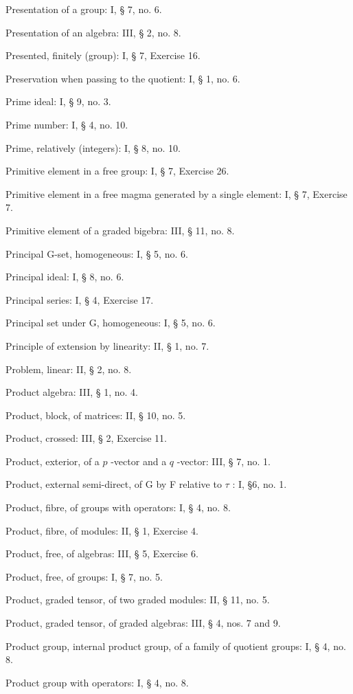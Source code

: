 Presentation of a group: I, § 7, no. 6.

Presentation of an algebra: III, § 2, no. 8.

Presented, finitely (group): I, § 7, Exercise 16.

Preservation when passing to the quotient: I, § 1, no. 6.

Prime ideal: I, § 9, no. 3.

Prime number: I, § 4, no. 10.

Prime, relatively (integers): I, § 8, no. 10.

Primitive element in a free group: I, § 7, Exercise 26.

Primitive element in a free magma generated by a single element: I, § 7, Exercise 7.

Primitive element of a graded bigebra: III, § 11, no. 8.

Principal G-set, homogeneous: I, § 5, no. 6.

Principal ideal: I, § 8, no. 6.

Principal series: I, § 4, Exercise 17.

Principal set under G, homogeneous: I, § 5, no. 6.

Principle of extension by linearity: II, § 1, no. 7.

Problem, linear: II, § 2, no. 8.

Product algebra: III, § 1, no. 4.

Product, block, of matrices: II, § 10, no. 5.

Product, crossed: III, § 2, Exercise 11.

Product, exterior, of a \(p\) -vector and a \(q\) -vector: III, § 7, no. 1.

Product, external semi-direct, of G by F relative to \(\tau\) : I, §6, no. 1.

Product, fibre, of groups with operators: I, § 4, no. 8.

Product, fibre, of modules: II, § 1, Exercise 4.

Product, free, of algebras: III, § 5, Exercise 6.

Product, free, of groups: I, § 7, no. 5.

Product, graded tensor, of two graded modules: II, § 11, no. 5.

Product, graded tensor, of graded algebras: III, § 4, nos. 7 and 9.

Product group, internal product group, of a family of quotient groups: I, § 4, no. 8.

Product group with operators: I, § 4, no. 8.

